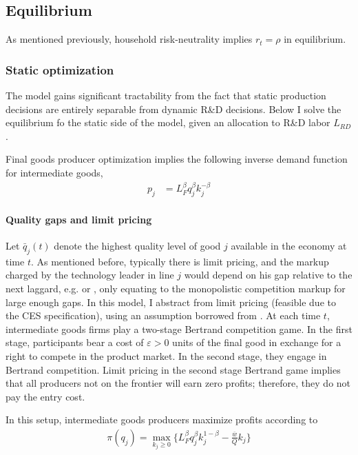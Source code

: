\documentclass[12pt,english]{article}
\theoremstyle{remark}
\begin{document}
\subsection{Equilibrium}

As mentioned previously, household risk-neutrality implies $r_t = \rho$ in equilibrium.

\subsubsection{Static optimization}

The model gains significant tractability from the fact that static production decisions are entirely separable from dynamic R\&D decisions. Below I solve the equilibrium fo the static side of the model, given an allocation to R\&D labor $L_{RD}$. 

Final goods producer optimization implies the following inverse demand function for intermediate goods, 
\begin{align*}
p_j &= L_F^{\beta} q_j^{\beta} k_j^{-\beta}	
\end{align*}

\paragraph{Quality gaps and limit pricing} Let $\bar{q}_j(t)$ denote the highest quality level of good $j$ available in the economy at time $t$. As mentioned before, typically there is limit pricing, and the markup charged by the technology leader in line $j$ would depend on his gap relative to the next laggard, e.g. \cite{baslandze_spinout_2019} or \cite{aghion_competition_2005}, only equating to the monopolistic competition markup for large enough gaps. In this model, I abstract from limit pricing (feasible due to the CES specification), using an assumption borrowed from \cite{akcigit_growth_2018}. At each time $t$, intermediate goods firms play a two-stage Bertrand competition game. In the first stage, participants bear a cost of $\varepsilon > 0$ units of the final good in exchange for a right to compete in the product market. In the second stage, they engage in Bertrand competition. Limit pricing in the second stage Bertrand game implies that all producers not on the frontier will earn zero profits; therefore, they do not pay the entry cost. 

In this setup, intermediate goods producers maximize profits according to
\begin{align}
\pi(q_j) = \max_{k_j \ge 0} \Big\{ L_F^{\beta} q_j^{\beta} k_j^{1-\beta} - \frac{\overline{w}}{Q} k_j \Big\} \label{incumbent_profit}
\end{align}
\end{document}
